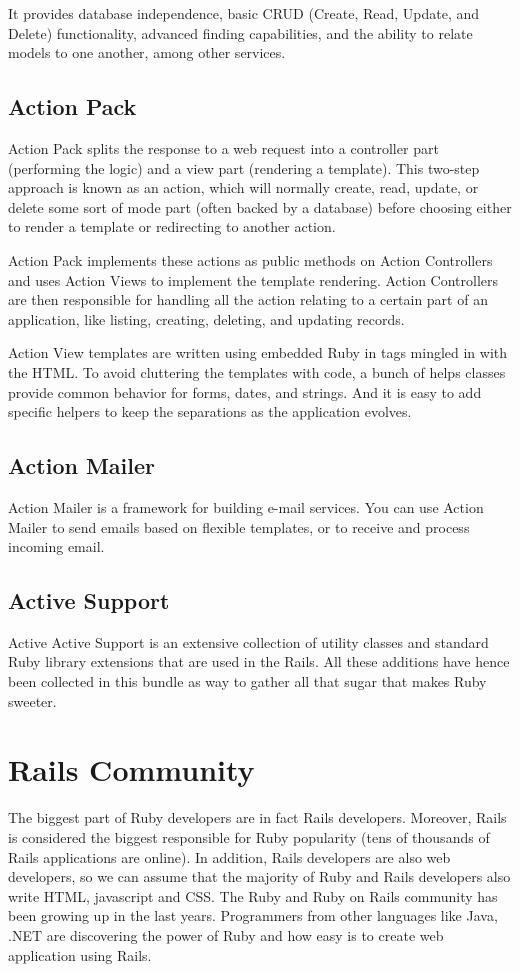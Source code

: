 It provides database independence, basic CRUD (Create, Read, Update, and Delete) functionality, advanced finding capabilities, and the ability to relate models to one another, among other services.


\subsection{Action Pack} 
Action Pack splits the response to a web request into a controller part (performing the logic) and a view part (rendering a template). This two-step approach is known as an action, which will normally create, read, update, 
or delete some sort of mode part (often backed by a database) 
before choosing either to render a template or redirecting to another action.

Action Pack implements these actions as public methods on Action Controllers and uses Action Views to implement the template rendering. Action Controllers are then responsible for handling all the action relating to a certain part of an application, 
like listing, creating, deleting, and updating records.

Action View templates are written using embedded Ruby in tags mingled in with the HTML. 
To avoid cluttering the templates with code, a bunch of helps classes provide common behavior for forms, dates, and strings. 
And it is easy to add specific helpers to keep the separations as the application evolves.


\subsection{Action Mailer}  
Action Mailer is a framework for building e-mail services. You can use Action Mailer to send emails based on flexible templates, or to receive and process incoming email.


\subsection{Active Support} Active 
Active Support is an extensive collection of utility classes and standard Ruby library extensions that are used in the Rails. All these additions have hence been collected in this bundle as way to gather all that sugar that makes Ruby sweeter.


\section{Rails Community} 
The biggest part of Ruby developers are in fact Rails developers. 
Moreover, Rails is considered the biggest responsible for Ruby popularity
(tens of thousands of Rails applications are online).
In addition, Rails developers are also web developers, 
so we can assume that the majority of Ruby and Rails developers also write HTML, javascript and CSS.
The Ruby and Ruby on Rails community has been growing up in the last years. 
Programmers from other languages like Java, .NET are discovering the power of Ruby and how easy is 
to create web application using Rails.

